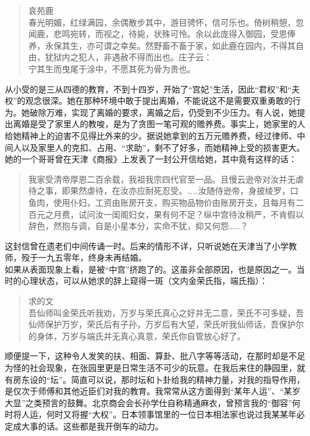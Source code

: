 \begin{quote}
	哀苑鹿\\

春光明媚，红绿满园，余偶散步其中，游目骋怀，信可乐也。倚树稍憩，忽闻鹿，悲鸣宛转，而视之，待毙，状殊可怜。余以此庞得入御园，受恩俸养，永保其生，亦可谓之幸矣。然野畜不畜于家，如此鹿在园内，不得其自由，犹狱内之犯人，非遇赦不得而出也。庄子云：\\

宁其生而曳尾于涂中，不愿其死为骨为贵也。\\
\end{quote}

从小受的是三从四德的教育，不到十四岁，开始了“宫妃”生活，因此“君权”和“夫权”的观念很深。她在那种环境中敢于提出离婚，不能说这不是需要双重勇敢的行为。她破除万难，实现了离婚的要求，离婚之后，仍受到不少压力。有人说，她提出离婚是受了家里人的教唆，是为了贪图一笔可观的赡养费。事实上，她家里的人给她精神上的迫害不见得比外来的少。据说她拿到的五万元赡养费，经过律师、中间人以及家里人的克扣、占用、“求助”，剩不了好多，而她精神上受的损害更大。她的一个哥哥曾在天津《商报》上发表了一封公开信给她，其中竟有这样的话：\\

\begin{quote}
	我家受清帝厚恩二百余载，我祖我宗四代官至一品。且慢云逊帝对汝并无虐待之事，即果然虐待，在汝亦应耐死忍受。……汝随侍逊帝，身披绫罗，口鱼肉，使用仆妇，工资由账房开支，购买物品物价由账房开支，且每月有二百元之月费，试问汝一闺阁妇女，果有何不足？纵中宫待汝稍严，不肯假以辞色，然抱与调，自是小星本分，实命不犹，抑又何怨……？\\
\end{quote}

这封信曾在遗老们中间传诵一时。后来的情形不详，只听说她在天津当了小学教师，殁于一九五零年，终身未再结婚。\\

如果从表面现象上看，是被“中宫”挤跑了的。这虽非全部原因，也是原因之一。当时的心理状态，可以从她求的辞上窥得一斑（文内金荣氏指，端氏指）：\\

\begin{quote}
	求的文\\

吾仙师叫金荣氏听我劝，万岁与荣氏真心之好并无二意，荣氏不可多疑，吾仙师保护万岁，荣氏后有子孙，万岁后有大望，荣氏听我仙师话，吾保护尔的身体，万岁与端氏并无真心真意，荣氏你自管放心好了。\\
\end{quote}

顺便提一下，这种令人发笑的扶、相面、算卦、批八字等等活动，在那时却是不足为怪的社会现象，在张园里更是日常生活不可少的玩意。在我后来住的静园里，就有房东设的“坛”。简直可以说，那时坛和卜卦给我的精神力量，对我的指导作用，是仅次于师傅和其他近臣们对我的教育。我常常从这方面得到“某年人运”、“某岁大显”之类预言的鼓舞。北京商会会长孙学仕自称精通麻衣，曾预言我的“御容”何时将人运，何时又将握“大权”。日本领事馆里的一位日本相法家也说过我某某年必定成大事的话。这些都是我开倒车的动力。
